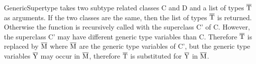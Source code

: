 GenericSupertype takes two subtype related classes C and D and a list of types $\overline{\text{T}}$ as arguments. If the two classes are the same, then the list of types $\overline{\text{T}}$ is returned. Otherwise the function is recursively called with the superclass C' of C.
However, the superclass C' may have different generic type variables than C. Therefore $\overline{\text{T}}$ is replaced by $\overline{\text{M}}$ where $\overline{\text{M}}$ are the generic type variables of C', but the generic type variables $\overline{\text{Y}}$ may occur in $\overline{\text{M}}$, therefore $\overline{\text{T}}$ is substituted for $\overline{\text{Y}}$ in $\overline{\text{M}}$.
